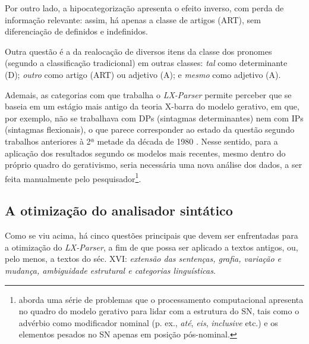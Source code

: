 \documentclass[portuguese]{textolivre}
\begin{document}
Por outro lado, a hipocategorização apresenta o efeito inverso, com perda de informação relevante: assim, há apenas a classe de artigos (ART), sem diferenciação de definidos e indefinidos.

Outra questão é a da realocação de diversos itens da classe dos pronomes (segundo a classificação tradicional) em outras classes: \textit{tal} como determinante (D); \textit{outro} como artigo (ART) ou adjetivo (A); e \textit{mesmo} como adjetivo (A).

Ademais, as categorias com que trabalha o \textit{LX-Parser} permite perceber que se baseia em um estágio mais antigo da teoria X-barra do modelo gerativo, em que, por exemplo, não se trabalhava com DPs (sintagmas determinantes) nem com IPs (sintagmas flexionais), o que parece corresponder ao estado da questão segundo trabalhos anteriores à 2ª metade da década de 1980 \cite{raposo_teoria_1992}. Nesse sentido, para a aplicação dos resultados segundo os modelos mais recentes, mesmo dentro do próprio quadro do gerativismo, seria necessária uma nova análise dos dados, a ser feita manualmente pelo pesquisador\footnote{\textcite{othero_gramatica_2009} aborda uma série de problemas que o processamento computacional apresenta no quadro do modelo gerativo para lidar com a estrutura do SN, tais como o advérbio como modificador nominal (p. ex., \textit{até}, \textit{eis}, \textit{inclusive} etc.) e os elementos pesados no SN apenas em posição pós-nominal.}.

\subsection{A otimização do analisador sintático}

Como se viu acima, há cinco questões principais que devem ser enfrentadas para a otimização do \textit{LX-Parser}, a fim de que possa ser aplicado a textos antigos, ou, pelo menos, a textos do séc. XVI: \textit{extensão das sentenças, grafia, variação e mudança, ambiguidade estrutural e categorias linguísticas}.
\end{document}
